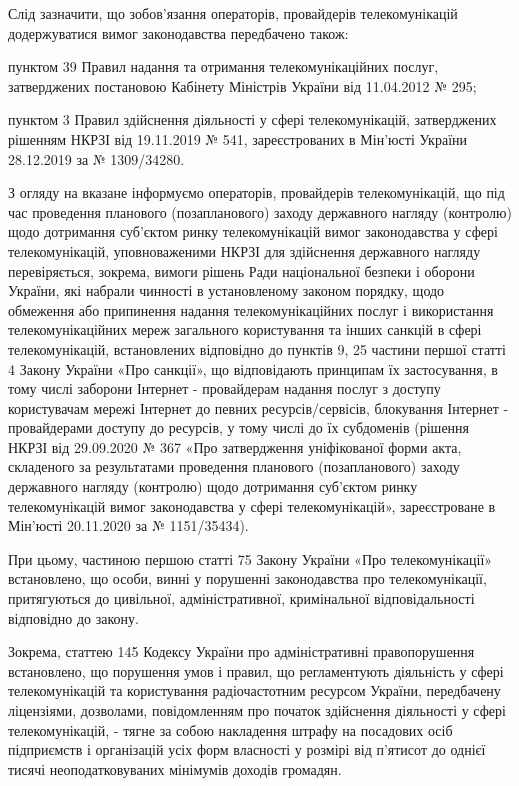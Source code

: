 Слід зазначити, що зобов'язання операторів, провайдерів телекомунікацій
додержуватися вимог законодавства передбачено також:

пунктом 39 Правил надання та отримання телекомунікаційних послуг, затверджених
постановою Кабінету Міністрів України від 11.04.2012 № 295;

пунктом 3 Правил здійснення діяльності у сфері телекомунікацій, затверджених
рішенням НКРЗІ від 19.11.2019 № 541, зареєстрованих в Мін’юсті України
28.12.2019 за № 1309/34280.

З огляду на вказане інформуємо операторів, провайдерів телекомунікацій, що під
час проведення планового (позапланового) заходу державного нагляду (контролю)
щодо дотримання суб’єктом ринку телекомунікацій вимог законодавства у сфері
телекомунікацій, уповноваженими НКРЗІ для здійснення державного нагляду
перевіряється, зокрема, вимоги рішень Ради національної безпеки і оборони
України, які набрали чинності в установленому законом порядку, щодо обмеження
або припинення надання телекомунікаційних послуг і використання
телекомунікаційних мереж загального користування та інших санкцій в сфері
телекомунікацій, встановлених відповідно до пунктів 9, 25 частини першої статті
4 Закону України «Про санкції», що відповідають принципам їх застосування, в
тому числі заборони Інтернет - провайдерам надання послуг з доступу
користувачам мережі Інтернет до певних ресурсів/сервісів, блокування Інтернет -
провайдерами доступу до ресурсів, у тому числі до їх субдоменів (рішення НКРЗІ
від 29.09.2020 № 367 «Про затвердження уніфікованої форми акта, складеного за
результатами проведення планового (позапланового) заходу державного нагляду
(контролю) щодо дотримання суб’єктом ринку телекомунікацій вимог законодавства
у сфері телекомунікацій», зареєстроване в Мін’юсті 20.11.2020 за № 1151/35434).

При цьому, частиною першою статті 75 Закону України «Про телекомунікації»
встановлено, що особи, винні у порушенні законодавства про телекомунікації,
притягуються до цивільної, адміністративної, кримінальної відповідальності
відповідно до закону.

Зокрема, статтею 145 Кодексу України про адміністративні правопорушення
встановлено, що порушення умов і правил, що регламентують діяльність у сфері
телекомунікацій та користування радіочастотним ресурсом України, передбачену
ліцензіями, дозволами, повідомленням про початок здійснення діяльності у сфері
телекомунікацій, - тягне за собою накладення штрафу на посадових осіб
підприємств і організацій усіх форм власності у розмірі від п’ятисот до однієї
тисячі неоподатковуваних мінімумів доходів громадян.

